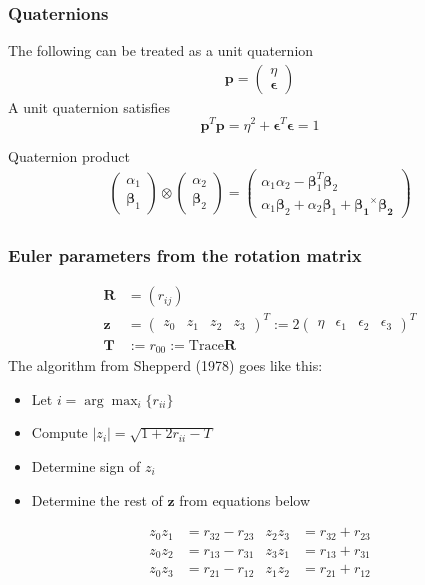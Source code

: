 %

\setcounter{subsubsection}{2}
\subsubsection{Quaternions}

The following can be treated as a unit quaternion
\begin{align*}
    \bm{p} = \begin{pmatrix}\eta \\ \bm{\epsilon}\end{pmatrix}
\end{align*}
A unit quaternion satisfies
\[\bm{p}^T\bm{p} = \eta^2 + \bm{\epsilon}^T\bm{\epsilon} = 1\]

Quaternion product
\begin{align*}
    \begin{pmatrix}\alpha_1 \\ \bm{\beta}_1\end{pmatrix} \otimes \begin{pmatrix}\alpha_2 \\ \bm{\beta}_2\end{pmatrix} = 
        \begin{pmatrix}\alpha_1\alpha_2-\bm{\beta}_1^T\bm{\beta}_2 \\ \alpha_1\bm{\beta}_2+\alpha_2\bm{\beta}_1 + \bm{\beta_1}^\times\bm{\beta_2}\end{pmatrix}
\end{align*}

\setcounter{subsubsection}{5}
\subsubsection{Euler parameters from the rotation matrix}
\begin{align*}
    \bm{R} & = (r_{ij}) \\
    \bm{z} &= \begin{pmatrix}z_0 & z_1 & z_2 & z_3 \end{pmatrix}^T := 2
        \begin{pmatrix}\eta & \epsilon_1 & \epsilon_2 & \epsilon_3\end{pmatrix}^T \\
            \bm{T} &:= r_{00} := \text{Trace} \bm{R}
\end{align*}
The algorithm from Shepperd (1978) goes like this:
\begin{itemize}
    \item Let \(i = \arg\max_i\{r_{ii}\}\)
    \item Compute \(|z_i| = \sqrt{1+2r_{ii}-T}\)
    \item Determine sign of \(z_i\)
    \item Determine the rest of \(\bm{z}\) from equations below
\end{itemize}
\begin{align*}
    z_0z_1 &= r_{32}-r_{23} & z_2z_3 &= r_{32}+r_{23} \\
    z_0z_2 &= r_{13}-r_{31} & z_3z_1 &= r_{13}+r_{31} \\
    z_0z_3 &= r_{21}-r_{12} & z_1z_2 &= r_{21}+r_{12} \\
\end{align*}

